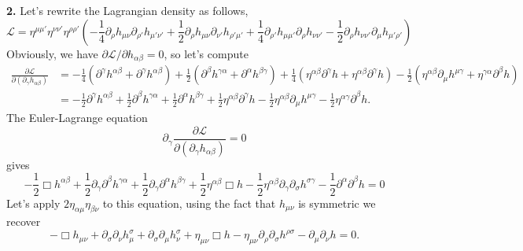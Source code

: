 \textbf{2.} Let's rewrite the Lagrangian density as follows,
\begin{equation}
    \mathcal{L} = \eta^{\mu\mu'}\eta^{\nu\nu'}\eta^{\rho\rho'} \left( -\frac{1}{4}\partial_\rho h_{\mu\nu}\partial_{\rho'} h_{\mu'\nu'} + \frac{1}{2}\partial_\rho h_{\mu\nu}\partial_{\nu'} h_{\rho'\mu'} + \frac{1}{4}\partial_{\rho'} h_{\mu\mu'}\partial_\rho h_{\nu\nu'} - \frac{1}{2}\partial_\rho h_{\nu\nu'}\partial_\mu h_{\mu'\rho'} \right)
\end{equation}
Obviously, we have $\partial\mathcal{L}/\partial h_{\alpha\beta} = 0$, so let's compute
\begin{equation}
\begin{aligned}
    \frac{\partial\mathcal{L}}{\partial(\partial_\gamma h_{\alpha\beta})} &= -\frac{1}{4}(\partial^\gamma h^{\alpha\beta} + \partial^\gamma h^{\alpha\beta}) + \frac{1}{2}(\partial^\beta h^{\gamma\alpha} + \partial^\alpha h^{\beta\gamma}) + \frac{1}{4}(\eta^{\alpha\beta}\partial^\gamma h + \eta^{\alpha\beta}\partial^\gamma h) - \frac{1}{2}(\eta^{\alpha\beta}\partial_\mu h^{\mu\gamma} + \eta^{\gamma\alpha}\partial^\beta h) \\
    &= -\frac{1}{2}\partial^\gamma h^{\alpha\beta} + \frac{1}{2}\partial^\beta h^{\gamma\alpha} + \frac{1}{2}\partial^\alpha h^{\beta\gamma} + \frac{1}{2}\eta^{\alpha\beta}\partial^\gamma h - \frac{1}{2}\eta^{\alpha\beta}\partial_\mu h^{\mu\gamma} - \frac{1}{2}\eta^{\alpha\gamma}\partial^\beta h.
\end{aligned}
\end{equation}
The Euler-Lagrange equation
\begin{equation}
    \partial_\gamma \frac{\partial\mathcal{L}}{\partial(\partial_\gamma h_{\alpha\beta})} = 0
\end{equation}
gives
\begin{equation}
    -\frac{1}{2}\Box h^{\alpha\beta} + \frac{1}{2}\partial_\gamma\partial^\beta h^{\gamma\alpha} + \frac{1}{2}\partial_\gamma\partial^\alpha h^{\beta\gamma} + \frac{1}{2}\eta^{\alpha\beta}\Box h - \frac{1}{2}\eta^{\alpha\beta}\partial_\gamma\partial_\sigma h^{\sigma\gamma} - \frac{1}{2}\partial^\alpha\partial^\beta h = 0
\end{equation}
Let's apply $2\eta_{\alpha\mu}\eta_{\beta\nu}$ to this equation, using the fact that $h_{\mu\nu}$ is symmetric we recover
\begin{equation}
    -\Box h_{\mu\nu} + \partial_\sigma\partial_\nu h^\sigma_\mu + \partial_\sigma\partial_\mu h^\sigma_\nu + \eta_{\mu\nu}\Box h - \eta_{\mu\nu}\partial_\rho\partial_\sigma h^{\rho\sigma} - \partial_\mu\partial_\nu h = 0.
\end{equation}

